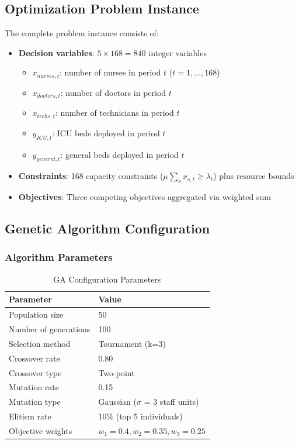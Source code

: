 \documentclass[12pt,a4paper]{article}
\begin{document}
	\subsection{Optimization Problem Instance}
	
	The complete problem instance consists of:
	\begin{itemize}
		\item \textbf{Decision variables}: $5 \times 168 = 840$ integer variables
		\begin{itemize}
			\item $x_{nurses,t}$: number of nurses in period $t$ ($t = 1, \ldots, 168$)
			\item $x_{doctors,t}$: number of doctors in period $t$
			\item $x_{techs,t}$: number of technicians in period $t$
			\item $y_{ICU,t}$: ICU beds deployed in period $t$
			\item $y_{general,t}$: general beds deployed in period $t$
		\end{itemize}
		\item \textbf{Constraints}: 168 capacity constraints ($\mu \sum_s x_{s,t} \geq \lambda_t$) plus resource bounds
		\item \textbf{Objectives}: Three competing objectives aggregated via weighted sum
	\end{itemize}
	
	\subsection{Genetic Algorithm Configuration}
	
	\subsubsection{Algorithm Parameters}
	
	\begin{table}[h]
		\centering
		\caption{GA Configuration Parameters}
		\begin{tabular}{@{}ll@{}}
			\toprule
			\textbf{Parameter} & \textbf{Value} \\ \midrule
			Population size & 50 \\
			Number of generations & 100 \\
			Selection method & Tournament (k=3) \\
			Crossover rate & 0.80 \\
			Crossover type & Two-point \\
			Mutation rate & 0.15 \\
			Mutation type & Gaussian ($\sigma$ = 3 staff units) \\
			Elitism rate & 10\% (top 5 individuals) \\
			Objective weights & $w_1=0.4, w_2=0.35, w_3=0.25$ \\ \bottomrule
		\end{tabular}
	\end{table}
	
\end{document}
